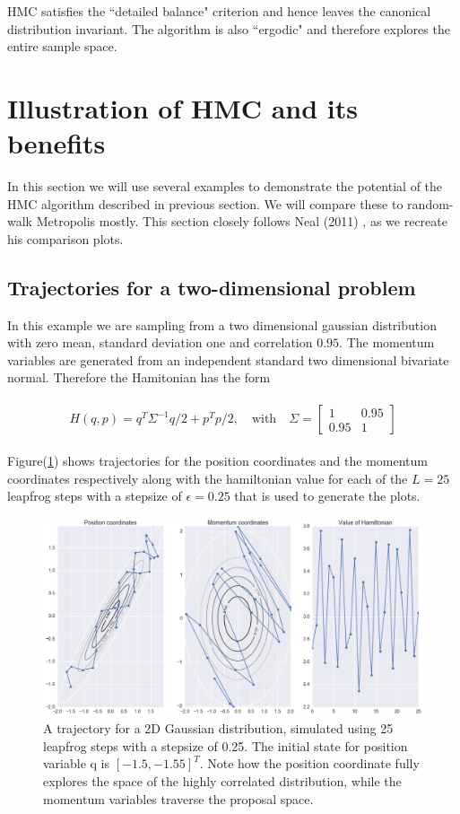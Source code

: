 \documentclass{article}
\numberwithin{equation}{section}
\begin{document}
HMC satisfies the ``detailed balance" criterion and hence leaves the canonical distribution invariant. The algorithm is also ``ergodic" and therefore explores the entire sample space.

\section{Illustration of HMC and its benefits}
In this section we will use several examples to demonstrate the potential of the HMC algorithm described in previous section. We will compare these to random-walk Metropolis mostly. This section closely follows Neal (2011) \cite{main}, as we recreate his comparison plots.

\subsection{Trajectories for a two-dimensional problem}
In this example we are sampling from a two dimensional gaussian distribution with zero mean, standard deviation one and correlation $0.95$. The momentum variables are generated from an independent standard two dimensional bivariate normal. Therefore the Hamitonian has the form 


\begin{align}
\begin{split}
H(q,p) = q^T\Sigma^{-1}q/2 + p^Tp/2, \quad \textrm{with} \quad \Sigma = 
\begin{bmatrix}
    1 & 0.95 \\
    0.95 & 1
  \end{bmatrix}
\end{split}
\label{eq:5.1}
\end{align}

Figure(\ref{Fig:1}) shows trajectories for the position coordinates and the momentum coordinates respectively along with the hamiltonian value for each of the $L=25$ leapfrog steps with a stepsize of $\epsilon = 0.25$ that is used to generate the plots.\\

\begin{figure}[H]
\centering
  \includegraphics[width=1\linewidth]{HMC_eg.png}
  \caption{A trajectory for a 2D Gaussian distribution, simulated using 25 leapfrog steps with a stepsize of 0.25. The initial state for position variable q is $[-1.5,-1.55]^T$. Note how the position coordinate fully explores the space of the highly correlated distribution, while the momentum variables traverse the proposal space.}
\label{Fig:1}
\end{figure}
\end{document}
